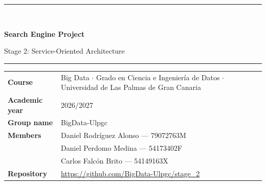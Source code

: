 \begin{titlepage}
\thispagestyle{empty}
\vspace*{2.5cm}
{\color{accent}\rule{\linewidth}{1.2pt}}\\[0.8cm]
{\Huge\bfseries Search Engine Project\par}
\vspace{0.4cm}
{\LARGE Stage 2: Service-Oriented Architecture\par}
\vspace{0.6cm}
{\color{accent}\rule{\linewidth}{1.2pt}}
\vspace{2cm}

\begin{tabular}{@{}>{\bfseries}L{3.4cm}L{10.5cm}@{}}
Course & Big Data $\cdot$ Grado en Ciencia e Ingeniería de Datos $\cdot$ Universidad de Las Palmas de Gran Canaria \\
Academic year & 2026/2027 \\
Group name & BigData-Ulpgc \\
Members & Daniel Rodríguez Alonso --- 79072763M \\
 & Daniel Perdomo Medina --- 54173402F \\
 & Carlos Falcón Brito --- 54149163X \\
Repository & \url{https://github.com/BigData-Ulpgc/stage_2} \\
\end{tabular}
\vfill
\end{titlepage}
